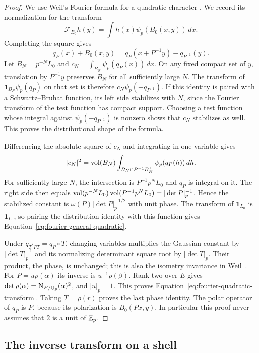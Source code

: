 \begin{proof}
We use Weil's Fourier formula for a quadratic character
\cite[Chapter~I, \S14, Theorem~2, p.~161]{Weil1964}.
We record its normalization for the transform
\[
 \mathcal F_{B_0}h(y)=\int h(x)\psi_p(B_0(x,y))\,dx.
\]
Completing the square gives
\[
 q_P(x)+B_0(x,y)=q_P(x+P^{-1}y)-q_{P^{-1}}(y).
\]
Let $B_N=p^{-N}L_0$ and $c_N=\int_{B_N}\psi_p(q_P(x))\,dx$.  On any fixed
compact set of $y$, translation by $P^{-1}y$ preserves $B_N$ for all
sufficiently large $N$.  The transform of
$\mathbf1_{B_N}\psi_p(q_P)$ on that set is therefore
$c_N\psi_p(-q_{P^{-1}})$.  If this identity is paired with a
Schwartz--Bruhat function, its left side stabilizes with $N$, since the
Fourier transform of the test function has compact support.  Choosing a
test function whose integral against $\psi_p(-q_{P^{-1}})$ is nonzero shows
that $c_N$ stabilizes as well.  This proves the distributional shape of the
formula.

Differencing the absolute square of $c_N$ and integrating in one variable
gives
\[
 |c_N|^2=\operatorname{vol}(B_N)
   \int_{B_N\cap P^{-1}B_N^\perp}\psi_p(q_P(h))\,dh.
\]
For sufficiently large $N$, the intersection is $P^{-1}p^NL_0$ and
$q_P$ is integral on it.  The right side then equals
$\operatorname{vol}(p^{-N}L_0)\operatorname{vol}(P^{-1}p^NL_0)=|\det P|_p^{-1}$.
Hence the stabilized constant is $\omega(P)|\det P|_p^{-1/2}$ with unit
phase.  The transform of $\mathbf1_{L_0}$ is $\mathbf1_{L_0}$, so pairing
the distribution identity with this function gives
Equation~\eqref{eq:fourier-general-quadratic}.

Under $q_{T^*PT}=q_P\circ T$, changing variables multiplies the Gaussian
constant by $|\det T|_p^{-1}$ and its normalizing determinant square root by
$|\det T|_p$.  Their product, the phase, is unchanged; this is also the
isometry invariance in Weil~\cite[Chapter~II, \S25, p.~173]{Weil1964}.
For $P=u\rho(\alpha)$ its inverse is $u^{-1}\rho(\beta)$.  Rank two over
$E$ gives $\det\rho(\alpha)=\operatorname{N}_{E/\mathbb Q_p}(\alpha)^2$, and $|u|_p=1$.
This proves Equation~\eqref{eq:fourier-quadratic-transform}.  Taking
$T=\rho(r)$ proves the last phase identity.  The polar operator of $q_P$ is
$P$, because its polarization is $B_0(Px,y)$.  In particular this proof
never assumes that $2$ is a unit of $\mathbb Z_p$.
\end{proof}

\subsection{The inverse transform on a shell}


